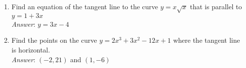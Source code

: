 \documentclass[11pt]{article}
\begin{document}
\begin{enumerate}
\begin{enumerate}
\end{enumerate}




\item Find an equation of the tangent line to the curve $y=x\sqrt{x}$ that is parallel to $y=1+3x$\\

{\em Answer}: $y=3x-4$\\

\item Find the points on the curve $y=2x^3+3x^2-12x+1$ where the tangent line is horizontal.\\

{\em Answer}: $(-2,21)$ and $(1,-6)$\\









\end{enumerate}
\end{document}
